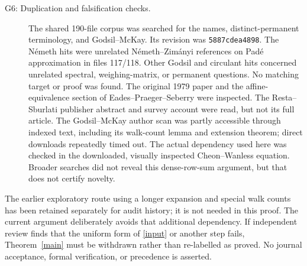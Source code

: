 \documentclass[11pt,a4paper]{article}
\begin{document}
\begin{description}
\item[G6: Duplication and falsification checks.] The shared 190-file corpus was searched for the names, distinct-permanent terminology, and Godsil--McKay. Its revision was \texttt{5887cdea4898}. The N\'emeth hits were unrelated N\'emeth--Zim\'anyi references on Pad\'e approximation in files 117/118. Other Godsil and circulant hits concerned unrelated spectral, weighing-matrix, or permanent questions. No matching target or proof was found. The original 1979 paper and the affine-equivalence section of Eades--Praeger--Seberry \cite{EPS} were inspected. The Resta--Sburlati publisher abstract and survey account were read, but not its full article. The Godsil--McKay author scan was partly accessible through indexed text, including its walk-count lemma and extension theorem; direct downloads repeatedly timed out. The actual dependency used here was checked in the downloaded, visually inspected Cheon--Wanless equation. Broader searches did not reveal this dense-row-sum argument, but that does not certify novelty.
\end{description}

The earlier exploratory route using a longer expansion and special walk counts has been retained separately for audit history; it is not needed in this proof. The current argument deliberately avoids that additional dependency. If independent review finds that the uniform form of \eqref{input} or another step fails, Theorem~\ref{main} must be withdrawn rather than re-labelled as proved. No journal acceptance, formal verification, or precedence is asserted.
\end{document}
